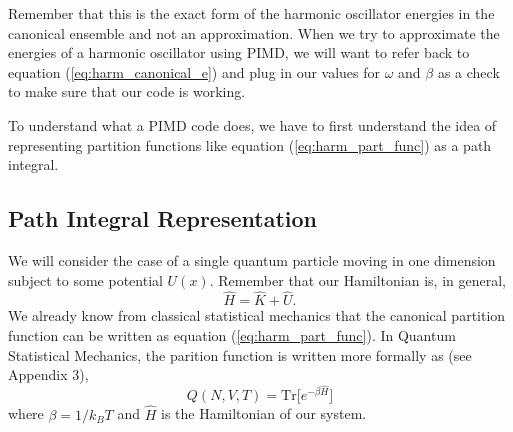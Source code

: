 \documentclass{article}
\newcommand{\be}{\begin{equation}}
\newcommand{\ee}{\end{equation}}
\begin{document}
Remember that this is the exact form of the harmonic oscillator energies in the canonical ensemble and not an approximation. When we try to approximate the energies of a harmonic oscillator using PIMD, we will want to refer back to equation (\ref{eq:harm_canonical_e}) and plug in our values for $\omega$ and $\beta$ as a check to make sure that our code is working.

To understand what a PIMD code does, we have to first understand the idea of representing partition functions like equation (\ref{eq:harm_part_func}) as a path integral.

\subsection{Path Integral Representation}
We will consider the case of a single quantum particle moving in one dimension subject to some potential $U(x)$.
Remember that our Hamiltonian is, in general,
\be
  \hat{H} = \hat{K} + \hat{U} .
\ee
We already know from classical statistical mechanics that the canonical partition function can be written as equation (\ref{eq:harm_part_func}).
In Quantum Statistical Mechanics, the parition function is written more formally as (see Appendix 3),
\be \label{eq:quan_part_func}
  Q(N, V, T) = \text{Tr}\Big[ e^{- \beta \hat{H}} \Big]
\ee
where $\beta = 1/k_BT$ and $\hat{H}$ is the Hamiltonian of our system.
\end{document}
